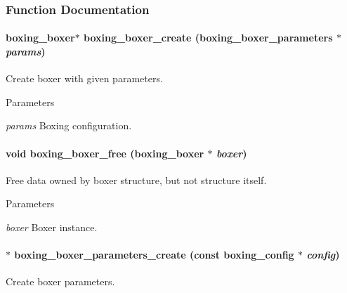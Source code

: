 \subsubsection{Function Documentation}
\hypertarget{group__boxer_ga185a034b3140ffa2f27552b45e122783}{
\paragraph[{boxing\_\-boxer\_\-create}]{\setlength{\rightskip}{0pt plus 5cm}boxing\_\-boxer$\ast$ boxing\_\-boxer\_\-create ({\bf boxing\_\-boxer\_\-parameters} $\ast$ {\em params})}\hfill}
\label{group__boxer_ga185a034b3140ffa2f27552b45e122783}
Create boxer with given parameters.


\begin{DoxyParams}{Parameters}
\item[{\em params}]Boxing configuration. \end{DoxyParams}
\hypertarget{group__boxer_gafbafe20dd1e70dd09896e80e9c76332d}{
\paragraph[{boxing\_\-boxer\_\-free}]{\setlength{\rightskip}{0pt plus 5cm}void boxing\_\-boxer\_\-free (boxing\_\-boxer $\ast$ {\em boxer})}\hfill}
\label{group__boxer_gafbafe20dd1e70dd09896e80e9c76332d}
Free data owned by boxer structure, but not structure itself.


\begin{DoxyParams}{Parameters}
\item[{\em boxer}]Boxer instance. \end{DoxyParams}
\hypertarget{group__boxer_ga7ff3d63a4b306374a16ad7a435d3aa52}{
\paragraph[{boxing\_\-boxer\_\-parameters\_\-create}]{$\ast$ boxing\_\-boxer\_\-parameters\_\-create (const {\bf boxing\_\-config} $\ast$ {\em config})}\hfill}
\label{group__boxer_ga7ff3d63a4b306374a16ad7a435d3aa52}
Create boxer parameters.


